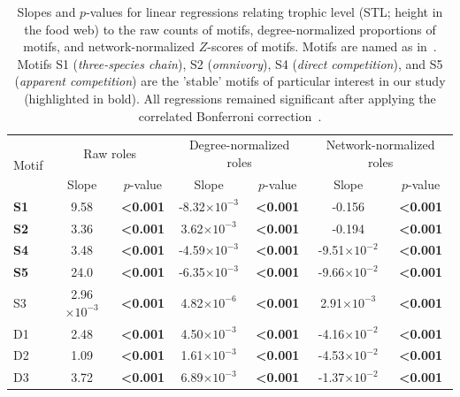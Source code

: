\documentclass[12pt]{article}
\begin{document}
    \begin{table}[h!]
        \caption{Slopes and $p$-values for linear regressions relating trophic level (STL; height in the food web) to the raw counts of motifs, degree-normalized proportions of motifs, and network-normalized $Z$-scores of motifs. Motifs are named as in~\citet{Stouffer2007}. Motifs S1 (\emph{three-species chain}), S2 (\emph{omnivory}), S4 (\emph{direct competition}), and S5 (\emph{apparent competition}) are the 'stable' motifs of particular interest in our study (highlighted in bold). All regressions remained significant after applying the correlated Bonferroni correction~\citep{Drezner2016}.}
        \label{TL_lms}
        \begin{tabular}{l | c c c c c c }
        \multirow{2}{*}{Motif} & \multicolumn{2}{c}{Raw roles} & \multicolumn{2}{c}{Degree-normalized roles} & \multicolumn{2}{c}{Network-normalized roles} \\
        & Slope & $p$-value & Slope & $p$-value & Slope & $p$-value \\
        \hline
        \textbf{S1}	&	9.58	&	\textbf{\textless0.001}	&	-8.32$\times10^{-3}$	&	\textbf{\textless0.001}	&	-0.156	&	\textbf{\textless0.001}	\\
        \textbf{S2}	&	3.36	&	\textbf{\textless0.001}	&	3.62$\times10^{-3}$	&	\textbf{\textless0.001}	&	-0.194	&	\textbf{\textless0.001}	\\
        \textbf{S4}	&	3.48	&	\textbf{\textless0.001}	&	-4.59$\times10^{-3}$	&	\textbf{\textless0.001}	&	-9.51$\times10^{-2}$	&	\textbf{\textless0.001}	\\
        \textbf{S5}	&	24.0	&	\textbf{\textless0.001}	&	-6.35$\times10^{-3}$	&	\textbf{\textless0.001}	&	-9.66$\times10^{-2}$	&	\textbf{\textless0.001}	\\
        \hline													
        S3	&	2.96$\times10^{-3}$	&	\textbf{\textless0.001}	&	4.82$\times10^{-6}$	&	\textbf{\textless0.001}	&	2.91$\times10^{-3}$	&	\textbf{\textless0.001}	\\
        D1	&	2.48	&	\textbf{\textless0.001}	&	4.50$\times10^{-3}$	&	\textbf{\textless0.001}	&	-4.16$\times10^{-2}$	&	\textbf{\textless0.001}	\\
        D2	&	1.09	&	\textbf{\textless0.001}	&	1.61$\times10^{-3}$	&	\textbf{\textless0.001}	&	-4.53$\times10^{-2}$	&	\textbf{\textless0.001}	\\
        D3	&	3.72	&	\textbf{\textless0.001}	&	6.89$\times10^{-3}$	&	\textbf{\textless0.001}	&	-1.37$\times10^{-2}$	&	\textbf{\textless0.001}	\\

\end{tabular}
\end{table}
\end{document}
